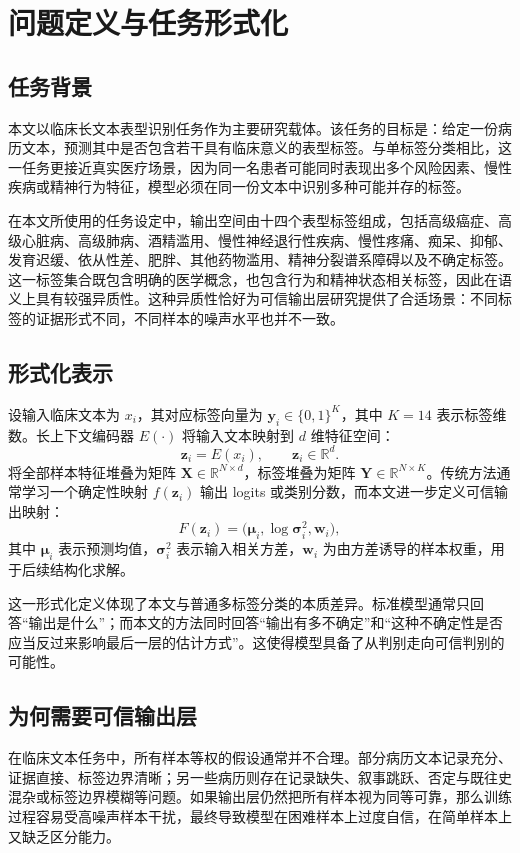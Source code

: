 \section{问题定义与任务形式化}
\subsection{任务背景}
本文以临床长文本表型识别任务作为主要研究载体。该任务的目标是：给定一份病历文本，预测其中是否包含若干具有临床意义的表型标签。与单标签分类相比，这一任务更接近真实医疗场景，因为同一名患者可能同时表现出多个风险因素、慢性疾病或精神行为特征，模型必须在同一份文本中识别多种可能并存的标签。

在本文所使用的任务设定中，输出空间由十四个表型标签组成，包括高级癌症、高级心脏病、高级肺病、酒精滥用、慢性神经退行性疾病、慢性疼痛、痴呆、抑郁、发育迟缓、依从性差、肥胖、其他药物滥用、精神分裂谱系障碍以及不确定标签。这一标签集合既包含明确的医学概念，也包含行为和精神状态相关标签，因此在语义上具有较强异质性。这种异质性恰好为可信输出层研究提供了合适场景：不同标签的证据形式不同，不同样本的噪声水平也并不一致。

\subsection{形式化表示}
设输入临床文本为 $x_i$，其对应标签向量为 $\mathbf{y}_i \in \{0,1\}^{K}$，其中 $K=14$ 表示标签维数。长上下文编码器 $E(\cdot)$ 将输入文本映射到 $d$ 维特征空间：
\[
\mathbf{z}_i = E(x_i), \qquad \mathbf{z}_i \in \mathbb{R}^{d}.
\]
将全部样本特征堆叠为矩阵 $\mathbf{X} \in \mathbb{R}^{N\times d}$，标签堆叠为矩阵 $\mathbf{Y} \in \mathbb{R}^{N\times K}$。传统方法通常学习一个确定性映射 $f(\mathbf{z}_i)$ 输出 logits 或类别分数，而本文进一步定义可信输出映射：
\[
F(\mathbf{z}_i)=\big(\boldsymbol{\mu}_i,\log \boldsymbol{\sigma}_i^2,\mathbf{w}_i\big),
\]
其中 $\boldsymbol{\mu}_i$ 表示预测均值，$\boldsymbol{\sigma}_i^2$ 表示输入相关方差，$\mathbf{w}_i$ 为由方差诱导的样本权重，用于后续结构化求解。

这一形式化定义体现了本文与普通多标签分类的本质差异。标准模型通常只回答“输出是什么”；而本文的方法同时回答“输出有多不确定”和“这种不确定性是否应当反过来影响最后一层的估计方式”。这使得模型具备了从判别走向可信判别的可能性。

\subsection{为何需要可信输出层}
在临床文本任务中，所有样本等权的假设通常并不合理。部分病历文本记录充分、证据直接、标签边界清晰；另一些病历则存在记录缺失、叙事跳跃、否定与既往史混杂或标签边界模糊等问题。如果输出层仍然把所有样本视为同等可靠，那么训练过程容易受高噪声样本干扰，最终导致模型在困难样本上过度自信，在简单样本上又缺乏区分能力。

